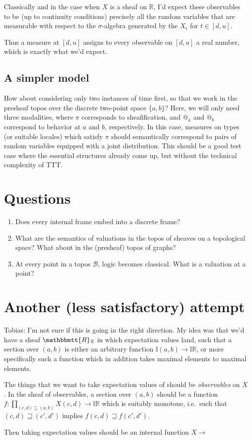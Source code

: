 \documentclass[11pt, oneside, article]{memoir}
\makeatletter
\theoremstyle{plain}
\theoremstyle{definition}
\theoremstyle{remark}
\newcommand{\cat}[1]{\mathcal{#1}}
\newcommand{\internal}[1]{\raisebox{-.03ex}{$\mathbbmtt{#1}$}}
\newcommand{\hs}{\hspace{1.1pt}}
\newcommand{\EE}{\mathbb{E}} %
\newcommand{\II}{\mathbb{I}} %
\newcommand{\RR}{\mathbb{R}}
\newcommand{\tRR}{\internal{R}\hs}
\newcommand{\AtSymbol}{{@}}
\newcommand{\At}[2][]{\AtSymbol^{#1}_{#2}}
\makeatother
\begin{document}
Classically and in the case when $X$ is a sheaf on $\RR$, I'd expect these observables to be (up to continuity conditions) precisely all the random variables that are measurable with respect to the $\sigma$-algebra generated by the $X_t$ for $t\in [d,u]$.

Thus a measure at $[d,u]$ assigns to every observable on $[d,u]$ a real number, which is exactly what we'd expect.

\section{A simpler model}

How about considering only two instances of time first, so that we work in the presheaf topos over the discrete two-point space $\{a,b\}$? Here, we will only need three modalities, where $\pi$ corresponds to sheafification, and $\At{a}{}$ and $\At{b}{}$ correspond to behavior at $a$ and $b$, respectively. In this case, measures on types (or suitable locales) which satisfy $\pi$ should semantically correspond to pairs of random variables equipped with a joint distribution. This should be a good test case where the essential structures already come up, but without the technical complexity of TTT.


\chapter{Questions}

\begin{enumerate}
	\item Does every internal frame embed into a discrete frame?
	\item What are the semantics of valuations in the topos of sheaves on a topological space? What about in the (presheaf) topos of graphs?
	\item At every point in a topos $\cat{B}$, logic becomes classical. What is a valuation at a point?
\end{enumerate}

\chapter{Another (less satisfactory) attempt}

Tobias: I'm not sure if this is going in the right direction. My idea was that we'd have a sheaf $\tRR_{\EE}$ in which expectation values land, such that a section over $(a,b)$ is either an arbitrary function $\II(a,b)\to\II\RR$, or more specifically such a function which in addition takes maximal elements to maximal elements.

The things that we want to take expectation values of should be \emph{observables} on $X$. In the sheaf of observables, a section over $(a,b)$ should be a function $f:\prod_{(c,d)\subseteq(a,b)} X(c,d)\to\II\RR$ which is suitably monotone, i.e.~such that $(c,d)\sqsupseteq(c',d')$ implies $f(c,d)\sqsupseteq f(c',d')$.

Then taking expectation values should be an internal function $X\to $

\printbibliography
\end{document}
